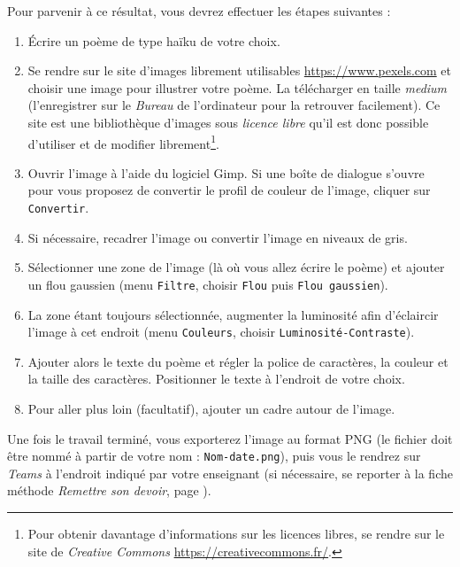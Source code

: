 {Pour parvenir à ce résultat, vous devrez effectuer les étapes suivantes :
\begin{enumerate}
\item Écrire un poème de type haïku de votre choix.
\item Se rendre sur le site d'images librement utilisables \url{https://www.pexels.com} et choisir une image pour illustrer votre poème. La télécharger en taille \emph{medium} (l'enregistrer sur le \emph{Bureau} de l'ordinateur pour la retrouver facilement). Ce site est une bibliothèque d'images sous \emph{licence libre} qu'il est donc possible d'utiliser et de modifier librement\footnote{Pour obtenir davantage d'informations sur les licences libres, se rendre sur le site de \emph{Creative Commons} \url{https://creativecommons.fr/}.}.
\item Ouvrir l'image à l'aide du logiciel Gimp. Si une boîte de dialogue s'ouvre pour vous proposez de convertir le profil de couleur de l'image, cliquer sur \texttt{Convertir}.
\item Si nécessaire, recadrer l'image ou convertir l'image en niveaux de gris.
\item Sélectionner une zone de l'image (là où vous allez écrire le poème) et ajouter un flou gaussien (menu \texttt{Filtre}, choisir \texttt{Flou} puis \texttt{Flou gaussien}).   
\item La zone étant toujours sélectionnée, augmenter la luminosité afin d'éclaircir l'image à cet endroit (menu \texttt{Couleurs}, choisir \texttt{Luminosité-Contraste}). 
\item Ajouter alors le texte du poème et régler la police de caractères, la couleur et la taille des caractères. Positionner le texte à l'endroit de votre choix.
\item Pour aller plus loin (facultatif), ajouter un cadre autour de l'image.
\end{enumerate}
Une fois le travail terminé, vous exporterez l'image au format PNG (le fichier doit être nommé à partir de votre nom : \texttt{Nom-date.png}), puis vous le rendrez sur \emph{Teams} à l'endroit indiqué par votre enseignant (si nécessaire, se reporter à la fiche méthode \emph{Remettre son devoir}, page \pageref{TeamsRemettreDevoir}).}




